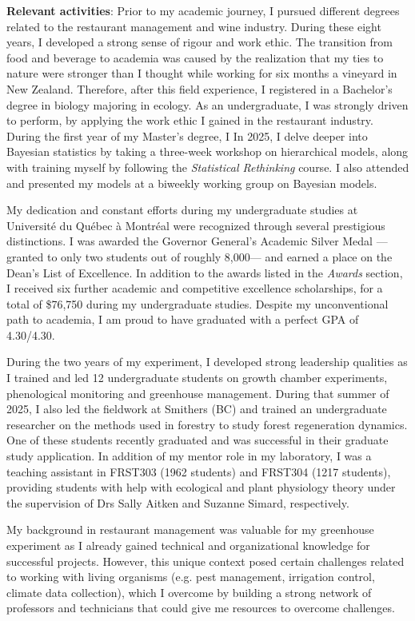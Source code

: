 \documentclass[12pt]{article}
\begin{document}
\textbf{Relevant activities}: Prior to my academic journey, I pursued different degrees related to the restaurant management and wine industry. During these eight years, I developed a strong sense of rigour and work ethic. The transition from food and beverage to academia was caused by the realization that my ties to nature were stronger than I thought while working for six months a vineyard in New Zealand. Therefore, after this field experience, I registered in a Bachelor's degree in biology majoring in ecology. As an undergraduate, I was strongly driven to perform, by applying the work ethic I gained in the restaurant industry. During the first year of my Master's degree, I In 2025, I delve deeper into Bayesian statistics by taking a three-week workshop on hierarchical models, along with training myself by following the \textit{Statistical Rethinking} course. I also attended and presented my models at a biweekly working group on Bayesian models. 

My dedication and constant efforts during my undergraduate studies at Université du Québec à Montréal were recognized through several prestigious distinctions. I was awarded the Governor General's Academic Silver Medal --- granted to only two students out of roughly 8,000--- and earned a place on the Dean's List of Excellence. In addition to the awards listed in the \textit{Awards} section, I received six further academic and competitive excellence scholarships, for a total of \$76,750 during my undergraduate studies. Despite my unconventional path to academia, I am proud to have graduated with a perfect GPA of 4.30/4.30.

During the two years of my experiment, I developed strong leadership qualities as I trained and led 12 undergraduate students on growth chamber experiments, phenological monitoring and greenhouse management. During that summer of 2025, I also led the fieldwork at Smithers (BC) and trained an undergraduate researcher on the methods used in forestry to study forest regeneration dynamics. One of these students recently graduated and was successful in their graduate study application. In addition of my mentor role in my laboratory, I was a teaching assistant in FRST303 (1962 students) and FRST304 (1217 students), providing students with help with ecological and plant physiology theory under the supervision of Drs Sally Aitken and Suzanne Simard, respectively. 

My background in restaurant management was valuable for my greenhouse experiment as I already gained technical and organizational knowledge for successful projects. However, this unique context posed certain challenges related to working with living organisms (e.g. pest management, irrigation control, climate data collection), which I overcome by building a strong network of professors and technicians that could give me resources to overcome challenges.
        
\end{document}
